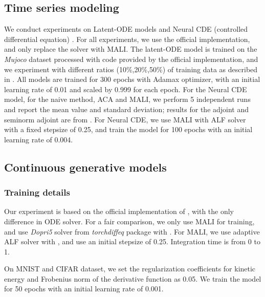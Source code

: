 \documentclass{article} \usepackage{iclr2021_conference,times}
\begin{document}
\subsection{Time series modeling}
We conduct experiments on Latent-ODE models \citep{rubanova2019latent} and Neural CDE (controlled differential equation) \citep{kidger2020hey}. For all experiments, we use the official implementation, and only replace the solver with MALI. The latent-ODE model is trained on the \textit{Mujoco} dataset processed with code provided by the official implementation, and we experiment with different ratios (10\%,20\%,50\%) of training data as described in \citep{rubanova2019latent}. All models are trained for 300 epochs with Adamax optimizer, with an initial learning rate of 0.01 and scaled by 0.999 for each epoch. For the Neural CDE model, for the naive method, ACA and MALI, we perform 5 independent runs and report the mean value and standard deviation; results for the adjoint and seminorm adjoint are from \citep{kidger2020hey}. For Neural CDE, we use MALI with ALF solver with a fixed stepsize of 0.25, and train the model for 100 epochs with an initial learning rate of 0.004.

\subsection{Continuous generative models}
\label{sup:sec:ffjord}
\subsubsection{Training details}
Our experiment is based on the official implementation of \citep{finlay2020train}, with the only difference in ODE solver. For a fair comparison, we only use MALI for training, and use \textit{Dopri5} solver from \textit{torchdiffeq} package \citep{chen2018neural} with . For MALI, we use adaptive ALF solver with , and use an initial stepsize of 0.25. Integration time is from 0 to 1. 

On MNIST and CIFAR dataset, we set the regularization coefficients for kinetic energy and Frobenius norm of the derivative function as 0.05. We train the model for 50 epochs with an initial learning rate of 0.001.
\end{document}
